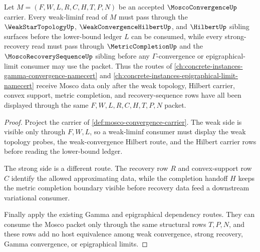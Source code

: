\begin{theorem}
\label{thm:mosco-convergence-weak-strong-sibling-route}
Let $M=(F,W,L,R,C,H,T,P,N)$ be an accepted $\MoscoConvergenceUp$ carrier. Every weak-liminf read of $M$ must pass through the $\WeakStarTopologyUp$, $\WeakConvergenceHilbertUp$, and $\HilbertUp$ sibling surfaces before the lower-bound ledger $L$ can be consumed, while every strong-recovery read must pass through $\MetricCompletionUp$ and the $\MoscoRecoverySequenceUp$ sibling before any $\Gamma$-convergence or epigraphical-limit consumer may use the packet. Thus the routes of \autoref{ch:concrete-instances-gamma-convergence-namecert} and \autoref{ch:concrete-instances-epigraphical-limit-namecert} receive Mosco data only after the weak topology, Hilbert carrier, convex support, metric completion, and recovery-sequence rows have all been displayed through the same $F,W,L,R,C,H,T,P,N$ packet.
\end{theorem}
\begin{proof}
Project the carrier of \autoref{def:mosco-convergence-carrier}. The weak side is visible only through $F,W,L$, so a weak-liminf consumer must display the weak topology probes, the weak-convergence Hilbert route, and the Hilbert carrier rows before reading the lower-bound ledger.

The strong side is a different route. The recovery row $R$ and convex-support row $C$ identify the allowed approximating data, while the completion handoff $H$ keeps the metric completion boundary visible before recovery data feed a downstream variational consumer.

Finally apply the existing Gamma and epigraphical dependency routes. They can consume the Mosco packet only through the same structural rows $T,P,N$, and these rows add no host equivalence among weak convergence, strong recovery, Gamma convergence, or epigraphical limits.
\end{proof}
